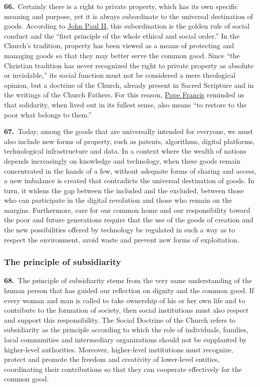 \documentclass{article}
\begin{document}
\textbf{66.}\ Certainly there is a right to private property, which has its own specific meaning and purpose, yet it is always subordinate to the universal destination of goods. According to \href{https://www.vatican.va/content/john-paul-ii/en.html}{John Paul II}, this subordination is the golden rule of social conduct and the ``first principle of the whole ethical and social order.''\cite{n88} In the Church's tradition, property has been viewed as a means of protecting and managing goods so that they may better serve the common good. Since ``the Christian tradition has never recognized the right to private property as absolute or inviolable,''\cite{n89} its social function must not be considered a mere theological opinion, but a doctrine of the Church, already present in Sacred Scripture and in the writings of the Church Fathers. For this reason, \href{https://www.vatican.va/content/francesco/en.html}{Pope Francis} reminded us that solidarity, when lived out in its fullest sense, also means ``to restore to the poor what belongs to them.''\cite{n90}

\textbf{67.}\ Today, among the goods that are universally intended for everyone, we must also include new forms of property, such as patents, algorithms, digital platforms, technological infrastructure and data. In a context where the wealth of nations depends increasingly on knowledge and technology, when these goods remain concentrated in the hands of a few, without adequate forms of sharing and access, a new imbalance is created that contradicts the universal destination of goods. In turn, it widens the gap between the included and the excluded, between those who can participate in the digital revolution and those who remain on the margins. Furthermore, care for our common home and our responsibility toward the poor and future generations require that the use of the goods of creation and the new possibilities offered by technology be regulated in such a way as to respect the environment, avoid waste and prevent new forms of exploitation.

\subsubsection{The principle of subsidiarity}

\textbf{68.}\ The principle of subsidiarity stems from the very same understanding of the human person that has guided our reflection on dignity and the common good. If every woman and man is called to take ownership of his or her own life and to contribute to the formation of society, then social institutions must also respect and support this responsibility. The Social Doctrine of the Church refers to subsidiarity as the principle according to which the role of individuals, families, local communities and intermediary organizations should not be supplanted by higher-level authorities. Moreover, higher-level institutions must recognize, protect and promote the freedom and creativity of lower-level entities, coordinating their contributions so that they can cooperate effectively for the common good.\cite{n91}
\end{document}
